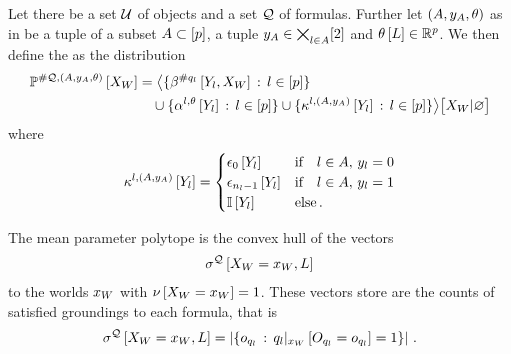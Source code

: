 \begin{definition}
    Let there be a set $\mathcal{U}$ of objects and a set $\mathcal{Q}$ of \firstOrderLogic{} formulas.
    Further let $(A,y_{A},\theta)$ as in  be a tuple of a subset $A\subset[p]$, a tuple $y_{A}\in\bigtimes_{l\in A}[2]$ and $\theta\left[L\right]\in\mathbb{R}^{p}$.
    We then define the \HybridFOLNetwork{} as the distribution
    \begin{align*}
        \mathbb{P}^{\#\mathcal{Q},(A,y_{A},\theta)}\left[X_{W}\right]
        &= \big\langle \{\beta^{\#q_{l}}\left[Y_{l},X_{W}\right]\,:\,l\in[p]\} \\
        & \quad \cup \{\alpha^{l,\theta}\left[Y_{l}\right]\,:\,l\in[p]\}
        \cup \{\kappa^{l,(A,y_{A})}\left[Y_{l}\right]\,:\,l\in[p]\}
         \big\rangle \big[ X_{W} | \varnothing \big]
    \end{align*}
    where
    \begin{align*}
        \kappa^{l,(A,y_{A})}\left[Y_{l}\right]
        = \begin{cases}
              \epsilon_{0}\left[Y_{l}\right] & \text{if}\quad l\in A ,\, y_{l} = 0 \\
              \epsilon_{n_{l}-1}\left[Y_{l}\right] & \text{if}\quad l\in A ,\, y_{l} = 1 \\
              \mathbb{I}\left[Y_{l}\right] & \text{else} \, .
        \end{cases}
    \end{align*}
\end{definition}



The mean parameter polytope is the convex hull of the vectors
\begin{align*}
    \sigma^{\mathcal{Q}}\left[X_{W}=x_{W},L\right]
\end{align*}
to the worlds $x_{W}$ with $\nu\left[X_{W}=x_{W}\right]=1$.
These vectors store are the counts of satisfied groundings to each formula, that is
\begin{align*}
    \sigma^{\mathcal{Q}}\left[X_{W}=x_{W},L\right] = \left|
        \{o_{q_{l}} \,:\, {q_{l}}|_{x_{W}} \left[O_{q_{l}}=o_{q_{l}}\right] = 1 \}
    \right| \, .
\end{align*}

